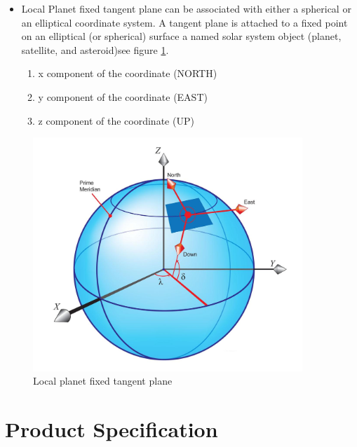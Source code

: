 \documentclass[twoside,11pt,titlepage]{report}
\begin{document}
\begin{itemize}
\label{reqt:pfixtan}\ \newline
\item Local Planet fixed tangent plane can be associated with either a spherical or an elliptical coordinate system.
A tangent plane is attached to a fixed point on an elliptical (or spherical) surface a named solar system object (planet, satellite, and asteroid)see figure \ref{fig:3}.
\begin{enumerate}
\item x component of the coordinate (NORTH)
\item y component of the coordinate (EAST)
\item z component of the coordinate (UP)
\end{enumerate}
\end{itemize}

\begin{figure}[htb]
\centering
\includegraphics [width=4in]{figs/tan.jpg}
\caption{Local planet fixed tangent plane}
\label{fig:3}
\end{figure}

\chapter{Product Specification}\label{ch:spec}
\end{document}
